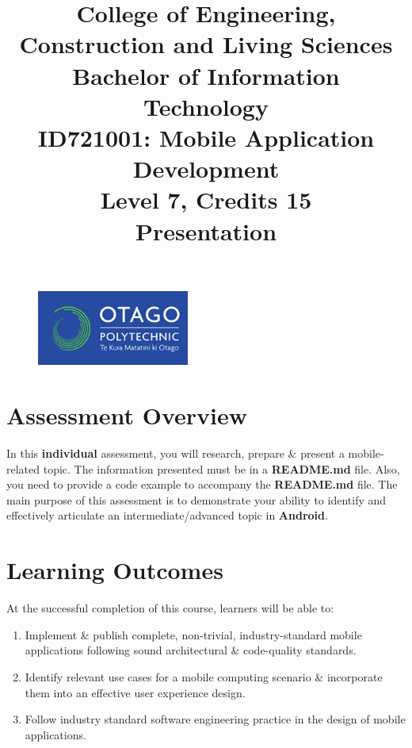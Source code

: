 \documentclass{article}
\author{}
\begin{document}
\begin{figure}
	\centering
	\includegraphics[width=50mm]{../../resources/img/logo.png}
\end{figure}

\title{College of Engineering, Construction and Living Sciences\\Bachelor of Information Technology\\ID721001: Mobile Application Development\\Level 7, Credits 15\\\textbf{Presentation}}
\date{}
\maketitle

\section*{Assessment Overview}
In this \textbf{individual} assessment, you will research, prepare \& present a mobile-related topic. The information presented must be in a \textbf{README.md} file. Also, you need to provide a code example to accompany the \textbf{README.md} file. The main purpose of this assessment is to demonstrate your ability to identify and effectively articulate an intermediate/advanced topic in \textbf{Android}.

\section*{Learning Outcomes}
At the successful completion of this course, learners will be able to:
\begin{enumerate}
	\item Implement \& publish complete, non-trivial, industry-standard mobile applications following sound architectural \& code-quality standards.
	\item Identify relevant use cases for a mobile computing scenario \& incorporate them into an effective user experience design.
	\item Follow industry standard software engineering practice in the design of mobile applications.
\end{enumerate}
\end{document}
